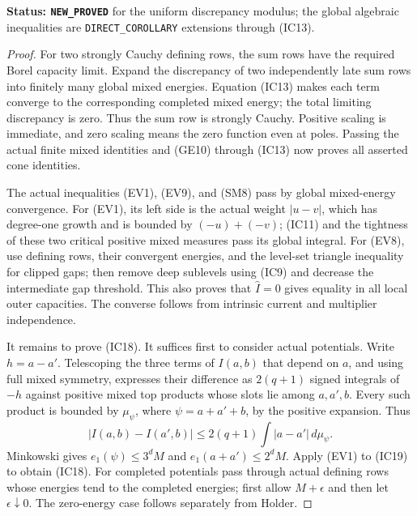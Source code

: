 \noindent\textbf{Status: \texttt{NEW\_PROVED}} for the uniform
discrepancy modulus; the global algebraic inequalities are
\texttt{DIRECT\_COROLLARY} extensions through (IC13).

\begin{proof}
For two strongly Cauchy defining rows, the sum rows have the
required Borel capacity limit. Expand the discrepancy of two
independently late sum rows into finitely many global mixed
energies. Equation (IC13) makes each term converge to the
corresponding completed mixed energy; the total limiting
discrepancy is zero. Thus the sum row is strongly Cauchy.
Positive scaling is immediate, and zero scaling means the
zero function even at poles. Passing the actual finite mixed
identities and (GE10) through (IC13) now proves all asserted
cone identities.

The actual inequalities (EV1), (EV9), and (SM8) pass by
global mixed-energy convergence. For (EV1), its left side is
the actual weight $|u-v|$, which has degree-one growth and is
bounded by $(-u)+(-v)$; (IC11) and the tightness of these two
critical positive mixed measures pass its global integral.
For (EV8), use defining rows, their convergent energies,
and the level-set triangle inequality for clipped gaps;
then remove deep sublevels using (IC9) and decrease the
intermediate gap threshold. This also proves that
$\widehat I=0$ gives equality in all local outer capacities.
The converse follows from intrinsic current and multiplier
independence.

It remains to prove (IC18). It suffices first to consider
actual potentials. Write $h=a-a'$. Telescoping the three
terms of $I(a,b)$ that depend on $a$, and using full mixed
symmetry, expresses their difference as $2(q+1)$ signed
integrals of $-h$ against positive mixed top products whose
slots lie among $a,a',b$. Every such product is bounded by
$\mu_\psi$, where $\psi=a+a'+b$, by the positive expansion.
Thus
\[
 |I(a,b)-I(a',b)|
                  \leq2(q+1)\int|a-a'|\,d\mu_\psi.
 \tag{IC19}
\]
Minkowski gives $e_1(\psi)\leq3^dM$ and
$e_1(a+a')\leq2^dM$. Apply (EV1) to (IC19) to obtain
(IC18). For completed potentials pass through actual
defining rows whose energies tend to the completed energies;
first allow $M+\epsilon$ and then let $\epsilon\downarrow0$.
The zero-energy case follows separately from Holder.
\end{proof}

